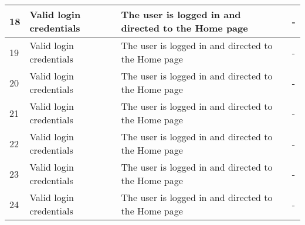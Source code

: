 \begin{table}
\begin{tabular}{ | p{2cm} | p{3cm} | p{4cm} | p{4cm} | }
	\hline
	18 & Valid login credentials & The user is logged in and directed to the Home page & - \\
	\hline
	19 & Valid login credentials & The user is logged in and directed to the Home page & - \\
	\hline
	20 & Valid login credentials & The user is logged in and directed to the Home page & - \\
	\hline
	21 & Valid login credentials & The user is logged in and directed to the Home page & - \\
	\hline
	22 & Valid login credentials & The user is logged in and directed to the Home page & - \\
	\hline
	23 & Valid login credentials & The user is logged in and directed to the Home page & - \\
	\hline
	24 & Valid login credentials & The user is logged in and directed to the Home page & - \\
	\hline
\end{tabular}
\end{table}